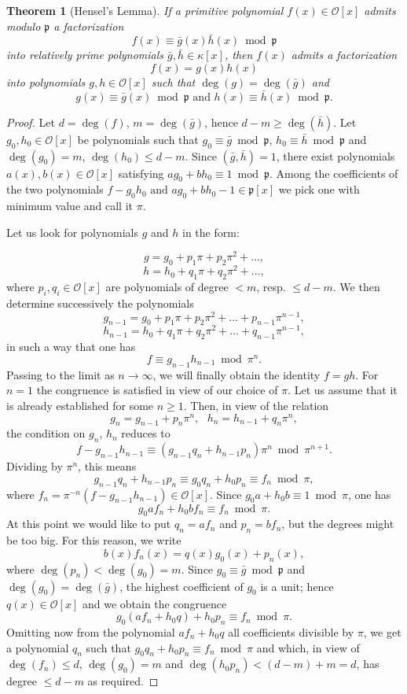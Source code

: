 \documentclass{article}
\newtheorem{theorem}{Theorem}
\begin{document}
\begin{theorem}[Hensel's Lemma]
If a primitive polynomial $f(x) \in \mathcal{O}[x]$ admits modulo $\mathfrak{p}$ a factorization
$$f(x) \equiv \bar{g}(x)\bar{h}(x) \bmod{\mathfrak{p}}$$
into relatively prime polynomials $\bar{g},\bar{h} \in \kappa[x]$, then $f(x)$ admits a factorization
$$f(x) = g(x)h(x)$$
into polynomials $g,h \in \mathcal{O}[x]$ such that $\deg(g) = \deg(\bar{g})$ and
$$g(x) \equiv \bar{g}(x) \bmod{\mathfrak{p}} \mbox{ and } h(x) \equiv \bar{h}(x) \bmod{\mathfrak{p}}.$$
\end{theorem}
\begin{proof}
Let $d = \deg(f)$, $m = \deg(\bar{g})$, hence $d - m \ge \deg(\bar{h})$. Let $g_0, h_0 \in \mathcal{O}[x]$ be polynomials such that $g_0 \equiv \bar{g} \bmod \mathfrak{p}$, $h_0 \equiv \bar{h} \bmod \mathfrak{p}$ and $\deg(g_0) = m$, $\deg(h_0) \le d-m$. Since $(
\bar{g}, \bar{h}) = 1$, there exist polynomials $a(x), b(x) \in \mathcal{O}[x]$ satisfying $ag_0 + bh_0 \equiv 1 \bmod \mathfrak{p}$.  Among the coefficients of the two polynomials $f-g_0h_0 \mbox{ and } ag_0 + bh_0 - 1 \in \mathfrak{p}[x]$ we pick one with minimum value and call it $\pi$.

Let us look for polynomials $g$ and $h$ in the form:

$$g = g_0 + p_1\pi + p_2\pi^2 + \ldots,$$
$$h = h_0 + q_1\pi + q_2\pi^2 + \ldots,$$
where $p_i, q_i \in \mathcal{O}[x]$ are polynomials of degree $< m$, resp. $\le d - m$.  We then determine successively the polynomials
$$g_{n-1} = g_0 + p_1\pi + p_2\pi^2 + \ldots + p_{n-1}\pi^{n-1},$$
$$h_{n-1} = h_0 + q_1\pi + q_2\pi^2 + \ldots + q_{n-1}\pi^{n-1},$$
in such a way that one has
$$f \equiv g_{n-1}h_{n-1} \bmod \pi^n.$$
Passing to the limit as $n \to \infty$, we will finally obtain the identity $f = gh$.  For $n=1$ the congruence is satisfied in view of our choice of $\pi$.  Let us assume that it is already established for some $n \ge 1$.  Then, in view of the relation
$$g_n = g_{n-1} + p_n\pi^n, \mbox{ } h_n = h_{n-1} + q_n\pi^n,$$
the condition on $g_n$, $h_n$ reduces to
$$f - g_{n-1}h_{n-1} \equiv (g_{n-1}q_n + h_{n-1}p_n)\pi^n \bmod \pi^{n+1}.$$
Dividing by $\pi^n$, this means
$$g_{n-1}q_n + h_{n-1}p_n \equiv g_0q_n + h_0p_n \equiv f_n \bmod \pi,$$
where $f_n = \pi^{-n}(f - g_{n-1}h_{n-1}) \in \mathcal{O}[x]$.  Since $g_0a + h_0b \equiv 1 \bmod \pi$, one has
$$g_0af_n + h_0bf_n \equiv f_n \bmod \pi.$$
At this point we would like to put $q_n = af_n$ and $p_n = bf_n$, but the degrees might be too big.  For this reason, we write
$$b(x)f_n(x) = q(x)g_0(x) + p_n(x),$$
where $\deg(p_n) < \deg(g_0) = m$.  Since $g_0 \equiv \bar{g} \bmod \mathfrak{p}$ and $\deg(g_0) = \deg(\bar{g})$, the highest coefficient of $g_0$ is a unit; hence $q(x) \in \mathcal{O}[x]$ and we obtain the congruence
$$g_0(af_n + h_0q) + h_0p_n \equiv f_n \bmod \pi.$$
Omitting now from the polynomial $af_n + h_0q$ all coefficients divisible by $\pi$, we get a polynomial $q_n$ such that $g_0q_n + h_0p_n \equiv f_n \bmod \pi$ and which, in view of $\deg(f_n) \le d$, $\deg(g_0) = m$ and $\deg(h_0p_n) < (d-m) + m = d$, has degree $\le d-m$ as required.
\end{proof}
\end{document}
